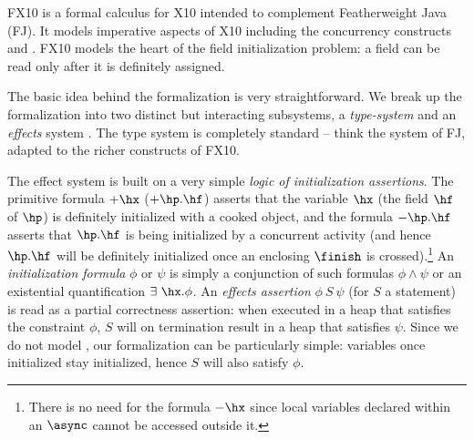 FX10 is a formal calculus for X10 intended to  complement Featherweight Java
(FJ).  It models imperative aspects of X10 including the concurrency
constructs \finish{} and \async{}.
FX10 models the heart of the field initialization problem:
    a field can be read only after it  is definitely assigned.


The basic idea behind the formalization is very straightforward. We
break up the formalization into two distinct but interacting
subsystems, a {\em type-system} and an {\em
  effects} system . The type
system is completely standard -- think the system of FJ, adapted to
the richer constructs of FX10.

The effect system is built on a very simple {\em logic of
  initialization assertions}.  The primitive formula $+\hx$
($+\hp.\hf$) asserts that the variable $\hx$ (the field $\hf$ of
$\hp$) is definitely initialized with a cooked object, and the formula
$-\hp.\hf$ asserts that $\hp.\hf$ is being initialized by a concurrent
activity (and hence $\hp.\hf$ will be definitely initialized once an
enclosing $\finish$ is crossed).\footnote{There is no need for the
  formula $-\hx$ since local variables declared within an $\async$
  cannot be accessed outside it.}  An {\em initialization formula}
$\phi$ or $\psi$ is simply a conjunction of such formulas $\phi \wedge
\psi$ or an existential quantification $\exists{}~\hx.\phi$.
An {\em
  effects assertion} $\phi~S~\psi$ (for $S$ a statement) is read as a
partial correctness assertion: when executed in a heap that satisfies
the constraint $\phi$, $S$ will on termination result in a heap that
satisfies $\psi$.  Since we do not model , our
formalization can be particularly simple: variables once initialized
stay initialized, hence $S$ will also satisfy $\phi$.

